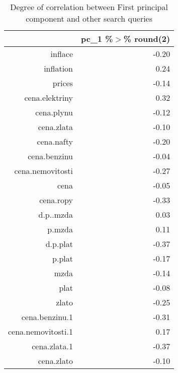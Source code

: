 \begin{table}[ht]
\centering
\begin{tabular}{rr}
  \hline
 & pc\_1 \%$>$\% round(2) \\ 
  \hline
inflace & -0.20 \\ 
  inflation & 0.24 \\ 
  prices & -0.14 \\ 
  cena.elektriny & 0.32 \\ 
  cena.plynu & -0.12 \\ 
  cena.zlata & -0.10 \\ 
  cena.nafty & -0.20 \\ 
  cena.benzinu & -0.04 \\ 
  cena.nemovitosti & -0.27 \\ 
  cena & -0.05 \\ 
  cena.ropy & -0.33 \\ 
  d.p..mzda & 0.03 \\ 
  p.mzda & 0.11 \\ 
  d.p.plat & -0.37 \\ 
  p.plat & -0.17 \\ 
  mzda & -0.14 \\ 
  plat & -0.08 \\ 
  zlato & -0.25 \\ 
  cena.benzinu.1 & -0.31 \\ 
  cena.nemovitosti.1 & 0.17 \\ 
  cena.zlata.1 & -0.37 \\ 
  cena.zlato & -0.10 \\ 
   \hline
\end{tabular}
\caption{Degree of correlation between First principal component and other search queries} 
\end{table}
